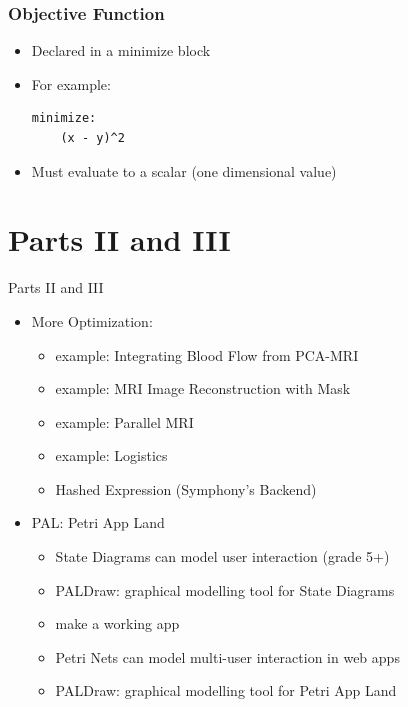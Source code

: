 \documentclass[presentation]{beamer}
\begin{document}
\begin{frame}[fragile]
  \frametitle{Objective Function}

  \begin{itemize}
  \item Declared in a {\color{red} minimize} block
  \item For example:
  \begin{lstlisting}[style=Haskell]
  minimize:
    (x - y)^2
  \end{lstlisting}
  \item Must evaluate to a scalar (one dimensional value)
  \end{itemize}
\end{frame}

\section{Parts II and III}

\begin{frame}{Parts II and III}
  \begin{itemize}
  \item More Optimization: 
  \begin{itemize}
  \item example: Integrating Blood Flow from PCA-MRI
  \item example: MRI Image Reconstruction with Mask
  \item example: Parallel MRI
  \item example: Logistics
  \item Hashed Expression (Symphony's Backend)
  \end{itemize}
  \item PAL:  Petri App Land
  \begin{itemize}
  \item State Diagrams can model user interaction (grade 5+)
  \item PALDraw:  graphical modelling tool for State Diagrams
  \item make a working app
  \item Petri Nets can model multi-user interaction in web apps
  \item PALDraw:  graphical modelling tool for Petri App Land
  \end{itemize}
  \end{itemize}
\end{frame}
\end{document}
